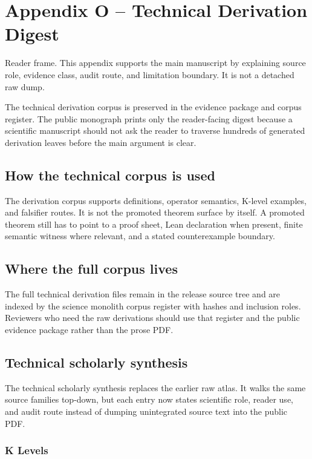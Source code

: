 \section{Appendix O -- Technical Derivation Digest}
Reader frame. This appendix supports the main manuscript by explaining source role, evidence class, audit route, and limitation boundary. It is not a detached raw dump.


\label{sec:oc-core-1-3-technical-derivation-atlas}

The technical derivation corpus is preserved in the evidence package and corpus register. The public monograph prints only the reader-facing digest because a scientific manuscript should not ask the reader to traverse hundreds of generated derivation leaves before the main argument is clear.


\subsection{How the technical corpus is used}

The derivation corpus supports definitions, operator semantics, K-level examples, and falsifier routes. It is not the promoted theorem surface by itself. A promoted theorem still has to point to a proof sheet, Lean declaration when present, finite semantic witness where relevant, and a stated counterexample boundary.


\subsection{Where the full corpus lives}

The full technical derivation files remain in the release source tree and are indexed by the science monolith corpus register with hashes and inclusion roles. Reviewers who need the raw derivations should use that register and the public evidence package rather than the prose PDF.


\subsection{Technical scholarly synthesis}

The technical scholarly synthesis replaces the earlier raw atlas. It walks the same source families top-down, but each entry now states scientific role, reader use, and audit route instead of dumping unintegrated source text into the public PDF.


\subsubsection{K Levels}

